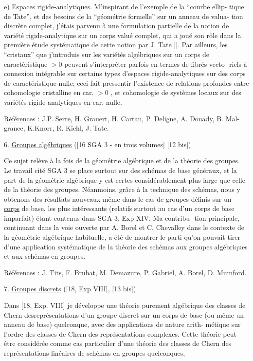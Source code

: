 
e) \uline{Espaces rigide-analytiques}. M'inspirant de l'exemple de la ``courbe ellip-%
tique de Tate'', et des besoins de la ``géométrie formelle'' sur un anneau de valua-%
tion discrète complet, j'étais parvenu à une formulation partielle de la notion
de variété rigide-analytique sur un corps valué complet, qui a joué son rôle dans
la première étude systématique de cette notion par J. Tate [\unsure{*}]. Par ailleurs,
les ``cristaux'' que j'introduis sur les variétés algébriques sur un corps de
caractéristique $>0$ peuvent s'interpréter parfois en termes de fibrés vecto-%
riels à connexion intégrable sur certains types d'espaces rigide-analytiques
sur des corps de caractéristique nulle; ceci fait pressentir l'existence de
relations profondes entre cohomologie cristalline en car. $>0$ , et cohomologie
de systèmes locaux sur des variétés rigide-analytiques en car. nulle.

\uline{Références} : J.P. Serre, H. Grauert, H. Cartan, P. Deligne, A. Douady, B. Mal-%
grance, K.Knorr, R. Kiehl, J. Tate.

6. \uline{Groupes algébriques} ([16 SGA 3 - en trois volumes] [12 bis])

Ce sujet relève à la fois de la géométrie algébrique et de la théorie
des groupes. Le travail cité SGA 3 se place surtout sur des schémas de base
généraux, et la part de la géométrie algébrique y est certes considérablement
plus large que celle de la théorie des groupes. Néanmoins, grâce à la technique
des schémas, nous y obtenons des résultats nouveaux même dans le cas de groupes
définis sur un \uline{corps} de base, les plus intéressants (relatifs surtout au cas
d'un corps de base imparfait) étant contenus dans SGA 3, Exp XIV. Ma contribu-%
tion principale, continuant dans la voie ouverte par A. Borel et C. Chevalley
dans le contexte de la géométrie algébrique habituelle, a été de montrer le
parti qu'on pouvait tirer d'une application systématique de la théorie des
schémas aux groupes algébriques et aux schémas en groupes.

\uline{Références} : J. Tits, F. Bruhat, M. Demazure, P. Gabriel, A. Borel, D. Mumford.

7. \uline{Groupes discrets} ([18, Exp VIII], [13 bis])

Dans [18, Exp. VIII] je développe une théorie purement algébrique des
classes de Chern desreprésentations d'un groupe discret sur un corps de base
(ou même un anneau de base) quelconque, avec des applications de nature arith-%
métique sur l'ordre des classes de Chern des représentations complexes. Cette
théorie peut être considérée comme cas particulier d'une théorie des classes
de Chern des représentations linéaires de schémas en groupes quelconques,

